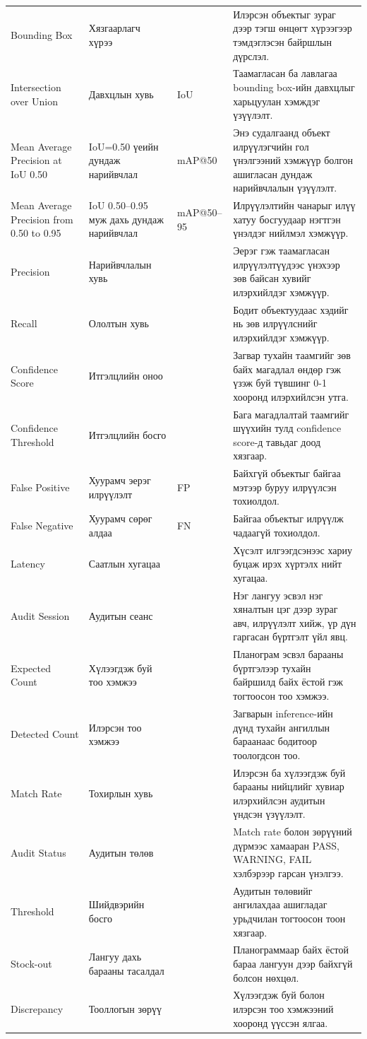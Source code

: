 {\begin{longtable}{P{0.22} P{0.20} P{0.10} P{0.40}}
Bounding Box & Хязгаарлагч хүрээ &  & Илэрсэн объектыг зураг дээр тэгш өнцөгт хүрээгээр тэмдэглэсэн байршлын дүрслэл. \\
Intersection over Union & Давхцлын хувь & IoU & Таамагласан ба лавлагаа bounding box-ийн давхцлыг харьцуулан хэмждэг үзүүлэлт. \\
Mean Average Precision at IoU 0.50 & IoU=0.50 үеийн дундаж нарийвчлал & mAP@50 & Энэ судалгаанд объект илрүүлэгчийн гол үнэлгээний хэмжүүр болгон ашигласан дундаж нарийвчлалын үзүүлэлт. \\
Mean Average Precision from 0.50 to 0.95 & IoU 0.50--0.95 муж дахь дундаж нарийвчлал & mAP@50--95 & Илрүүлэлтийн чанарыг илүү хатуу босгуудаар нэгтгэн үнэлдэг нийлмэл хэмжүүр. \\
Precision & Нарийвчлалын хувь &  & Эерэг гэж таамагласан илрүүлэлтүүдээс үнэхээр зөв байсан хувийг илэрхийлдэг хэмжүүр. \\
Recall & Ололтын хувь &  & Бодит объектуудаас хэдийг нь зөв илрүүлснийг илэрхийлдэг хэмжүүр. \\
Confidence Score & Итгэлцлийн оноо &  & Загвар тухайн таамгийг зөв байх магадлал өндөр гэж үзэж буй түвшинг 0-1 хооронд илэрхийлсэн утга. \\
Confidence Threshold & Итгэлцлийн босго &  & Бага магадлалтай таамгийг шүүхийн тулд confidence score-д тавьдаг доод хязгаар. \\
False Positive & Хуурамч эерэг илрүүлэлт & FP & Байхгүй объектыг байгаа мэтээр буруу илрүүлсэн тохиолдол. \\
False Negative & Хуурамч сөрөг алдаа & FN & Байгаа объектыг илрүүлж чадаагүй тохиолдол. \\
Latency & Саатлын хугацаа &  & Хүсэлт илгээгдсэнээс хариу буцаж ирэх хүртэлх нийт хугацаа. \\
\midrule

Audit Session & Аудитын сеанс &  & Нэг лангуу эсвэл нэг хяналтын цэг дээр зураг авч, илрүүлэлт хийж, үр дүн гаргасан бүртгэлт үйл явц. \\
Expected Count & Хүлээгдэж буй тоо хэмжээ &  & Планограм эсвэл барааны бүртгэлээр тухайн байршилд байх ёстой гэж тогтоосон тоо хэмжээ. \\
Detected Count & Илэрсэн тоо хэмжээ &  & Загварын inference-ийн дүнд тухайн ангиллын бараанаас бодитоор тоологдсон тоо. \\
Match Rate & Тохирлын хувь &  & Илэрсэн ба хүлээгдэж буй барааны нийцлийг хувиар илэрхийлсэн аудитын үндсэн үзүүлэлт. \\
Audit Status & Аудитын төлөв &  & Match rate болон зөрүүний дүрмээс хамааран PASS, WARNING, FAIL хэлбэрээр гарсан үнэлгээ. \\
Threshold & Шийдвэрийн босго &  & Аудитын төлөвийг ангилахдаа ашигладаг урьдчилан тогтоосон тоон хязгаар. \\
Stock-out & Лангуу дахь барааны тасалдал &  & Планограммаар байх ёстой бараа лангуун дээр байхгүй болсон нөхцөл. \\
Discrepancy & Тооллогын зөрүү &  & Хүлээгдэж буй болон илэрсэн тоо хэмжээний хооронд үүссэн ялгаа. \\
\midrule


\end{longtable}}
